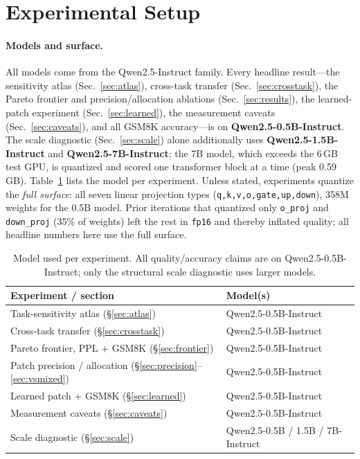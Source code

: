 \documentclass[11pt]{article}
\newcommand{\code}[1]{\texttt{#1}}
\begin{document}
\section{Experimental Setup}
\label{sec:setup}

\paragraph{Models and surface.} All models come from the Qwen2.5-Instruct
family. Every headline result---the sensitivity atlas
(Sec.~\ref{sec:atlas}), cross-task transfer
(Sec.~\ref{sec:crosstask}), the Pareto frontier and precision/allocation
ablations (Sec.~\ref{sec:results}), the learned-patch experiment
(Sec.~\ref{sec:learned}), the measurement caveats (Sec.~\ref{sec:caveats}), and
all GSM8K accuracy---is on \textbf{Qwen2.5-0.5B-Instruct}. The scale diagnostic
(Sec.~\ref{sec:scale}) alone additionally uses \textbf{Qwen2.5-1.5B-Instruct}
and \textbf{Qwen2.5-7B-Instruct}; the 7B model, which exceeds the 6\,GB test
GPU, is quantized and scored one transformer block at a time (peak 0.59\,GB).
Table~\ref{tab:models} lists the model per experiment. Unless stated,
experiments quantize the \emph{full surface}: all seven linear projection types
(\code{q,k,v,o,gate,up,down}), 358M weights for the 0.5B model. Prior iterations
that quantized only \code{o\_proj} and \code{down\_proj} (35\% of weights) left
the rest in \code{fp16} and thereby inflated quality; all headline numbers here
use the full surface.

\begin{table}[t]
\centering
\caption{Model used per experiment. All quality/accuracy claims are on
Qwen2.5-0.5B-Instruct; only the structural scale diagnostic uses larger models.}
\label{tab:models}
\begin{tabular}{ll}
\toprule
Experiment / section & Model(s) \\
\midrule
Task-sensitivity atlas (\S\ref{sec:atlas}) & Qwen2.5-0.5B-Instruct \\
Cross-task transfer (\S\ref{sec:crosstask}) & Qwen2.5-0.5B-Instruct \\
Pareto frontier, PPL + GSM8K (\S\ref{sec:frontier}) & Qwen2.5-0.5B-Instruct \\
Patch precision / allocation (\S\ref{sec:precision}--\ref{sec:vsmixed}) & Qwen2.5-0.5B-Instruct \\
Learned patch + GSM8K (\S\ref{sec:learned}) & Qwen2.5-0.5B-Instruct \\
Measurement caveats (\S\ref{sec:caveats}) & Qwen2.5-0.5B-Instruct \\
Scale diagnostic (\S\ref{sec:scale}) & Qwen2.5-0.5B / 1.5B / 7B-Instruct \\
\bottomrule
\end{tabular}
\end{table}
\end{document}
